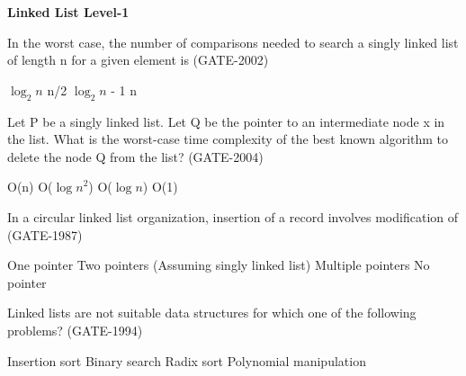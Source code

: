 
\centerline{\textbf{ \LARGE Linked List Level-1}}

\begin{questyle}
  \question  In the worst case, the number of comparisons needed to search a singly linked list of
            length n for a given element is  (GATE-2002)

  \begin{choices}
    \choice         \( \log_2n \)
    \choice         n/2
    \choice         \( \log_2n \) - 1
    \CorrectChoice  n

  \end{choices}
\end{questyle}

\begin{questyle}
  \question  Let P be a singly linked list. Let Q be the pointer to an intermediate node x in the list. What is
            the worst-case time complexity of the best known algorithm to delete the node Q from the list?  (GATE-2004)

  \begin{choices}
    \CorrectChoice  O(n)
    \choice         O(\( {\log n}^2 \))
    \choice         O(\( \log n \))
    \choice         O(1)
  \end{choices}
\end{questyle}

\begin{questyle}
  \question  In a circular linked list organization, insertion of a record involves modification of  (GATE-1987)

  \begin{choices}
    \choice         One pointer
    \CorrectChoice  Two pointers    (Assuming singly linked list)
    \choice         Multiple pointers
    \choice         No pointer
  \end{choices}
\end{questyle}

\begin{questyle}
  \question  Linked lists are not suitable data structures for which one of the following problems?  (GATE-1994)

  \begin{choices}
    \choice         Insertion sort
    \CorrectChoice  Binary search
    \choice         Radix sort
    \choice         Polynomial manipulation
  \end{choices}
\end{questyle}


